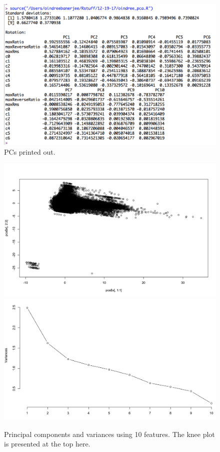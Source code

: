 \begin{figure}
\centering
\includegraphics[width=1.0\textwidth]{figures/PCs.png}
\caption{PCs printed out.}
\label{pc}
\end{figure}

\begin{figure}
\centering
\includegraphics[width=1.0\textwidth]{figures/pca_plot.png}
\includegraphics[width=1.0\textwidth]{figures/pca_variances.png}
\caption{Principal components and variances using 10 features. The knee plot is presented at the top here.}
\label{pca}
\end{figure}


